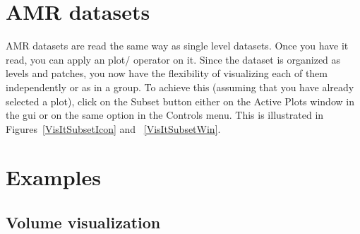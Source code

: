 \section{AMR datasets}



AMR datasets are read the same way as single level datasets. Once you
have it read, you can apply an plot/ operator on it. Since the dataset
is organized as levels and patches, you now have the flexibility of
visualizing each of them independently or as in a group. To achieve
this (assuming that you have already selected a plot), click on the
Subset button either on the Active Plots window in the gui or on the
same option in the Controls menu. This is illustrated in
Figures~\ref{VisItSubsetIcon} and ~\ref{VisItSubsetWin}.



\begin{figure}
  \centering
  \vspace{-80pt}
  \hspace{50pt}
  \caption{}
  \vspace{-10pt}
  \label{}
\end{figure}


\section{Examples}

\subsection{Volume visualization}

